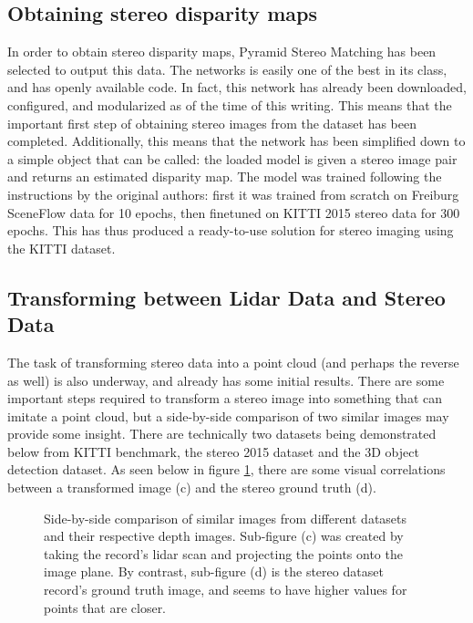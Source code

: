 \subsection{Obtaining stereo disparity maps}
In order to obtain stereo disparity maps, Pyramid Stereo Matching has been selected to output this data. The networks is easily one of the best in its class, and has openly available code. In fact, this network has already been downloaded, configured, and modularized as of the time of this writing. This means that the important first step of obtaining stereo images from the dataset has been completed. Additionally, this means that the network has been simplified down to a simple object that can be called: the loaded model is given a stereo image pair and returns an estimated disparity map. The model was trained following the instructions by the original authors: first it was trained from scratch on Freiburg SceneFlow data for 10 epochs, then finetuned on KITTI 2015 stereo data for 300 epochs. This has thus produced a ready-to-use solution for stereo imaging using the KITTI dataset. 

\subsection{Transforming between Lidar Data and Stereo Data}
The task of transforming stereo data into a point cloud (and perhaps the reverse as well) is also underway, and already has some initial results. There are some important steps required to transform a stereo image into something that can imitate a point cloud, but a side-by-side comparison of two similar images may provide some insight. There are technically two datasets being demonstrated below from KITTI benchmark, the stereo 2015 dataset and the 3D object detection dataset. As seen below in figure \ref{stereo_comparison}, there are some visual correlations between a transformed image (c) and the stereo ground truth (d).


\begin{figure}[ht]
    \centering  
    \label{stereo_comparison}
    \caption{Side-by-side comparison of similar images from different datasets and their respective depth images. Sub-figure (c) was created by taking the record's lidar scan and projecting the points onto the image plane. By contrast, sub-figure (d) is the stereo dataset record's ground truth image, and seems to have higher values for points that are closer. }
\end{figure}

